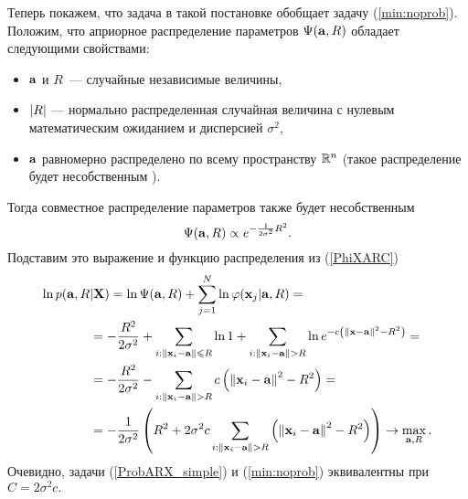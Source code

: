Теперь покажем, что задача в такой постановке обобщает задачу (\ref{min:noprob}).
Положим, что априорное распределение параметров $\Psi(\boldsymbol{\mathbf{a}},R)$ обладает следующими свойствами:
\begin{itemize}
 	\item $\boldsymbol{\mathbf{a}}$ и $R$~--- случайные независимые величины,
 	\item $\left|R\right|$ --- нормально распределенная случайная величина с нулевым математическим ожиданием и дисперсией $\sigma^2$,
 	\item $\boldsymbol{\mathbf{a}}$ равномерно распределено по всему пространству $\mathbb{R}^n$ (такое распределение будет несобственным \cite{Groot1974}).
 \end{itemize}
 Тогда совместное распределение параметров также будет несобственным
 $$\Psi(\boldsymbol{\mathbf{a}},R)\propto e^{-\frac1{2\sigma^2}R^2}.$$
 Подставим это выражение и функцию распределения из (\ref{PhiXARC})
 \begin{align}
 	\label{ProbARX_simple}
 	\ln p(\boldsymbol{\mathbf{a}},R&|\boldsymbol{\mathbf{X}})
 		=	\ln\Psi(\boldsymbol{\mathbf{a}},R) + \sum_{j=1}^N\ln\varphi(\boldsymbol{\mathbf{x}}_j|\boldsymbol{\mathbf{a}},R) =\notag \\
 		&= 	-\frac{R^2}{2\sigma^2} + \sum_{i: \left\|{\boldsymbol{\mathbf{x}}_i - \boldsymbol{\mathbf{a}}}\right\| \leqslant R} \ln 1
 			+ \sum_{i: \left\|{\boldsymbol{\mathbf{x}}_i - \boldsymbol{\mathbf{a}}}\right\| > R} \ln e^{-c \left(\left\|{\boldsymbol{\mathbf{x}}-\boldsymbol{\mathbf{a}}}\right\|^2-R^2\right)}  = \notag \\
 		&= -\frac{R^2}{2\sigma^2} - \sum_{i: \left\|{\boldsymbol{\mathbf{x}}_i - \boldsymbol{\mathbf{a}}}\right\| > R} c\left(\left\|{\boldsymbol{\mathbf{x}}_i - \boldsymbol{\mathbf{a}}}\right\|^2 - R^2\right) = \notag \\
 		&= -\frac1{2\sigma^2}\left(R^2 + 2\sigma^2 c\sum_{i: \left\|{\boldsymbol{\mathbf{x}}_i - \boldsymbol{\mathbf{a}}}\right\| > R} \left(\left\|{\boldsymbol{\mathbf{x}}_i - \boldsymbol{\mathbf{a}}}\right\|^2 -R^2\right)\right) \to \max_{\boldsymbol{\mathbf{a}}, R}.
 \end{align}
 Очевидно, задачи (\ref{ProbARX_simple}) и (\ref{min:noprob}) эквивалентны при $C = 2\sigma^2 c.$
